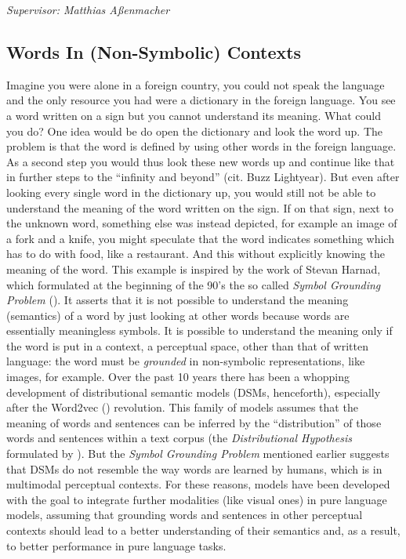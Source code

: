 \documentclass[
]{krantz}
\begin{document}
\emph{Supervisor: Matthias Aßenmacher}

\hypertarget{words-in-non-symbolic-contexts}{%
\subsection{Words In (Non-Symbolic) Contexts}\label{words-in-non-symbolic-contexts}}

Imagine you were alone in a foreign country, you could not speak the language and the only resource you had were a dictionary in the foreign language. You see a word written on a sign but you cannot understand its meaning. What could you do? One idea would be do open the dictionary and look the word up. The problem is that the word is defined by using other words in the foreign language. As a second step you would thus look these new words up and continue like that in further steps to the ``infinity and beyond'' (cit. Buzz Lightyear). But even after looking every single word in the dictionary up, you would still not be able to understand the meaning of the word written on the sign. If on that sign, next to the unknown word, something else was instead depicted, for example an image of a fork and a knife, you might speculate that the word indicates something which has to do with food, like a restaurant. And this without explicitly knowing the meaning of the word. This example is inspired by the work of Stevan Harnad, which formulated at the beginning of the 90's the so called \emph{Symbol Grounding Problem} (\citet{harnad1990symbol}). It asserts that it is not possible to understand the meaning (semantics) of a word by just looking at other words because words are essentially meaningless symbols. It is possible to understand the meaning only if the word is put in a context, a perceptual space, other than that of written language: the word must be \emph{grounded} in non-symbolic representations, like images, for example. Over the past 10 years there has been a whopping development of distributional semantic models (DSMs, henceforth), especially after the Word2vec (\citet{mikolov2013efficient}) revolution. This family of models assumes that the meaning of words and sentences can be inferred by the ``distribution'' of those words and sentences within a text corpus (the \emph{Distributional Hypothesis} formulated by \citet{harris1954distributional}). But the \emph{Symbol Grounding Problem} mentioned earlier suggests that DSMs do not resemble the way words are learned by humans, which is in multimodal perceptual contexts. For these reasons, models have been developed with the goal to integrate further modalities (like visual ones) in pure language models, assuming that grounding words and sentences in other perceptual contexts should lead to a better understanding of their semantics and, as a result, to better performance in pure language tasks.
\end{document}
